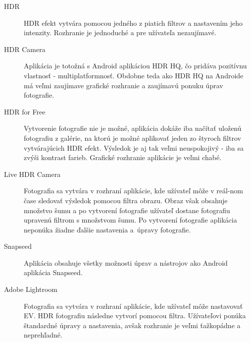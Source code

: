 \begin{description}
    \item [HDR]
    HDR efekt vytvára pomocou jedného z piatich filtrov a nastavením jeho intenzity. Rozhranie je jednoduché
    a pre užívateľa nezaujímavé.

    \item [HDR Camera]
    Aplikácia je totožná s Android aplikáciou HDR HQ, čo pridáva pozitívnu vlastnosť - multiplatformnosť.
    Obdobne teda ako HDR HQ na Androide má veľmi zaujímave grafické rozhranie a zaujímavú ponuku úprav fotografie.

    \item [HDR for Free]
    Vytvorenie fotografie nie je možné, aplikácia dokáže iba načítať uloženú fotografiu z galérie, na ktorú je
    možné aplikovať jeden zo štyroch filtrov vytvárajúcich HDR efekt. Výsledok je aj tak veľmi neuspokojivý - iba
    sa zvýši kontrast farieb. Grafické rozhranie aplikácie je veľmi chabé.

    \item [Live HDR Camera]
    Fotografia sa vytvára v rozhraní aplikácie, kde užívateľ môže v reál-nom čase sledovať výsledok pomocou filtra
    obrazu. Obraz však obsahuje množstvo šumu a po vytvorení fotografie užívateľ dostane fotografiu upravenú filtrom
    s množstvom šumu. Po vytvorení fotografie aplikácia neponúka žiadne ďalšie nastavenia a~úpravy fotografie.

    \item [Snapseed]
    Aplikácia obsahuje všetky možnosti úprav a nástrojov ako Android aplikácia Snapseed.

    \item [Adobe Lightroom]
    Fotografia sa vytvára v rozhraní aplikácie, kde užívateľ môže nastavovať EV. HDR fotografiu následne vytvorí pomocou
    filtra. Užívateľovi ponúka štandardné úpravy a nastavenia, avšak rozhranie je veľmi ťažkopádne a neprehľadné.

\end{description}

